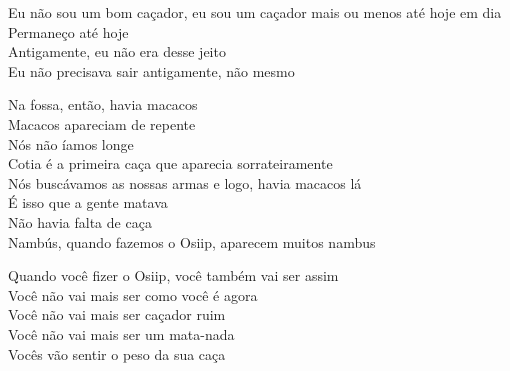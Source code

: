  \smallskip
 \begin{center}\end{center}
 \smallskip
 
\noindent  Eu não sou um bom caçador, eu sou um caçador mais ou menos até hoje em dia\\
 Permaneço até hoje\\
 Antigamente, eu não era desse jeito\\
 Eu não precisava sair antigamente, não mesmo
 
 \smallskip
 \begin{center}\end{center}
 \smallskip
 
\noindent  Na fossa, então, havia macacos\\
 Macacos apareciam de repente\\
 Nós não íamos longe\\
 Cotia é a primeira caça que aparecia sorrateiramente\\
 Nós buscávamos as nossas armas e logo, havia macacos lá\\
 É isso que a gente matava\\
 Não havia falta de caça\\
 Nambús, quando fazemos o Osiip, aparecem muitos nambus
 
 \smallskip
 \begin{center}\end{center}
 \smallskip
 
\noindent  Quando você fizer o Osiip, você também vai ser assim\\
 Você não vai mais ser como você é agora\\
 Você não vai mais ser caçador ruim\\
 Você não vai mais ser um mata-nada\\
 Vocês vão sentir o peso da sua caça
 
